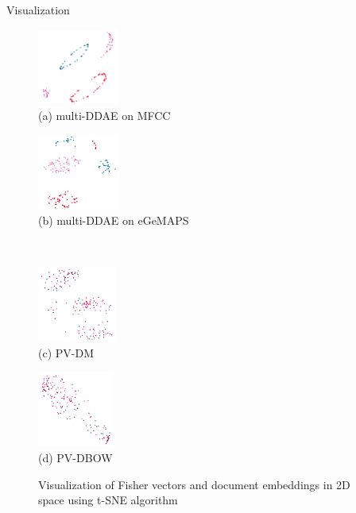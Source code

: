 \documentclass{beamer}
\begin{document}
\begin{frame}{Visualization}
    
\begin{figure}[htb]
    \centering
    \small
    \begin{minipage}[c]{0.4\linewidth}
    \centering
    \includegraphics[height=2.5cm]{images/multi_DDAE_MFCC_tsne.png} \\
    (a) multi-DDAE on MFCC
    \end{minipage}
    \begin{minipage}[c]{0.4\linewidth}
    \centering
    \includegraphics[height=2.5cm]{images/multi_DDAE_eGeMAPS_tsne.png} \\
    (b) multi-DDAE on eGeMAPS
    \end{minipage}
    \\
    \begin{minipage}[c]{0.4\linewidth}
    \centering
    \includegraphics[height=2.5cm]{images/dm_tsne_2d.png} \\
    (c) PV-DM 
    \end{minipage}
    \begin{minipage}[c]{0.4\linewidth}
    \centering
    \includegraphics[height=2.5cm]{images/dbow_tsne_2d.png} \\
    (d) PV-DBOW
    \end{minipage}
    \caption{Visualization of Fisher vectors and document embeddings in 2D space using t-SNE algorithm}
    \label{fig:tsne_DDAEs}
\end{figure}

\end{frame}
\end{document}
